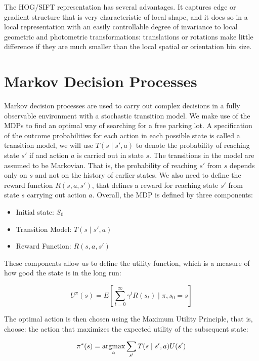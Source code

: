 The HOG/SIFT representation has several advantages. It captures edge or
gradient structure that is very characteristic of local shape, and it does
so in a local representation with an easily controllable degree of
invariance to local geometric and photometric transformations:
translations or rotations make little difference if they are much smaller
than the local spatial or orientation bin size.


\section{Markov Decision Processes}\label{sec:markov_descision_processes}
Markov decision processes are used to carry out complex decisions in a fully
observable environment with a stochastic transition model. We make use of the
MDPs to find an optimal way of searching for a free parking lot.  A
specification of the outcome probabilities for each action in each possible
state is called a transition model, we will use $T(s \mid s', a)$ to denote
the probability of reaching state $s'$ if and action $a$ is carried out in
state $s$. The transitions in the model are assumed to be Markovian. That is,
the probability of reaching $s'$ from $s$ depends only on $s$ and not on the
history of earlier states. We also need to define the reward function $R(s, a,
s')$, that defines a reward for reaching state $s'$ from state $s$ carrying
out action $a$. Overall, the MDP is defined by three components:

\begin{itemize}
    \item Initial state: $S_0$
    \item Transition Model: $T(s \mid s', a)$
    \item Reward Function: $R(s, a, s')$
\end{itemize}

These components allow us to define the utility function, which is a measure
of how good the state is in the long run:

\begin{equation}
U^{\pi}(s) = E\left[\sum_{t=0}^{\infty} \gamma^t R(s_t) \mid \pi,s_0 = s \right]
\end{equation}

The optimal action is then chosen using the Maximum Utility Principle, that
is, choose: the action that maximizes the expected utility of the subsequent
state:

\begin{equation}
\label{lbl:optimal_policy}
\pi^*(s) = \mathop{\rm argmax}_a \sum_{s'} T(s \mid s', a)U(s')
\end{equation}

